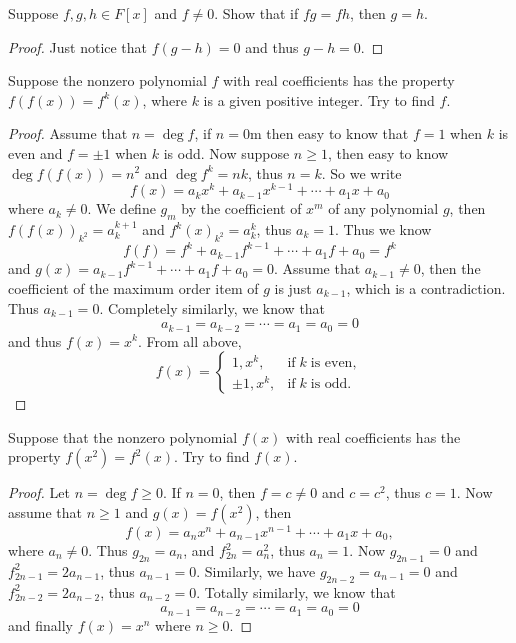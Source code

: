 \begin{pro}%
	Suppose $f,g,h\in F[x]$ and $f\neq 0$. Show that if $fg=fh$, then $g=h$.
\end{pro}
\begin{proof}
	Just notice that $f(g-h)=0$ and thus $g-h=0$.
\end{proof}

\begin{pro}%
	Suppose the nonzero polynomial $f$ with real coefficients has the property $f(f(x))=f^k(x)$, where $k$ is a given positive integer. Try to find $f$.
\end{pro}
\begin{proof}
	Assume that $n=\deg f$, if $n=0$m then easy to know that $f=1$ when $k$ is even and $f=\pm 1$ when $k$ is odd. Now suppose $n\geq 1$, then easy to know $\deg f(f(x))=n^2$ and $\deg f^k=nk$, thus $n=k$. So we write
	\[f(x)=a_kx^k+a_{k-1}x^{k-1}+\cdots+a_1x+a_0\]
	where $a_k\neq 0$. We define $g_m$ by the coefficient of $x^m$ of any polynomial $g$, then $f(f(x))_{k^2}=a_k^{k+1}$ and $f^k(x)_{k^2}=a_k^k$, thus $a_k=1$. Thus we know
	\[f(f)=f^k+a_{k-1}f^{k-1}+\cdots+a_1f+a_0=f^k\]
	and $g(x)=a_{k-1}f^{k-1}+\cdots+a_1f+a_0=0$.
	Assume that $a_{k-1}\neq 0$, then the coefficient of the maximum order item of $g$ is just $a_{k-1}$, which is a contradiction. Thus $a_{k-1}=0$. Completely similarly, we know that
	\[a_{k-1}=a_{k-2}=\cdots=a_1=a_0=0\] and thus $f(x)=x^k$.
	From all above, 
	\[f(x)=\begin{cases}
	1,x^k,&\mbox{if}\;k\;\mbox{is even},\\
	\pm 1,x^k,&\mbox{if}\;k\;\mbox{is odd}.
	\end{cases}\]
\end{proof}

\begin{pro}%
	Suppose that the nonzero polynomial $f(x)$ with real coefficients has the property $f(x^2)=f^2(x)$. Try to find $f(x)$.
\end{pro}
\begin{proof}
	Let $n=\deg f\geq 0$. If $n=0$, then $f=c\neq 0$ and $c=c^2$, thus $c=1$. Now assume that $n\geq 1$ and $g(x)=f(x^2)$, then
	\[f(x)=a_nx^n+a_{n-1}x^{n-1}+\cdots+a_1x+a_0,\]
	where $a_n\neq 0$.
	Thus $g_{2n}=a_n$, and $f^2_{2n}=a_n^2$, thus $a_n=1$. Now $g_{2n-1}=0$ and $f^2_{2n-1}=2a_{n-1}$, thus $a_{n-1}=0$. Similarly, we have $g_{2n-2}=a_{n-1}=0$ and $f^2_{2n-2}=2a_{n-2}$, thus $a_{n-2}=0$. Totally similarly, we know that
	\[a_{n-1}=a_{n-2}=\cdots=a_1=a_0=0\]
	and finally $f(x)=x^n$ where $n\geq 0$. 
\end{proof}

